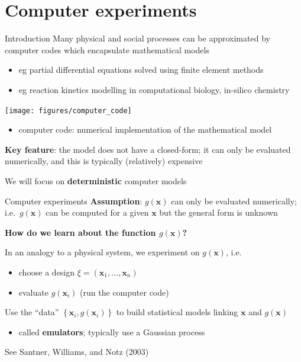 \documentclass[
  ignorenonframetext,
]{beamer}
\providecommand{\tightlist}{%
  \setlength{\itemsep}{0pt}\setlength{\parskip}{0pt}}
\begin{document}
\hypertarget{computer-experiments}{%
\section{Computer experiments}\label{computer-experiments}}

\begin{frame}{Introduction}
\protect\hypertarget{introduction-2}{}
Many physical and social processes can be approximated by computer codes
which encapsulate mathematical models

\begin{itemize}
\tightlist
\item
  eg partial differential equations solved using finite element methods
\item
  eg reaction kinetics modelling in computational biology, in-silico
  chemistry
\end{itemize}

\begin{center}\texttt{[image: figures/computer\_code]} \end{center}

\begin{itemize}
\tightlist
\item
  computer code: numerical implementation of the mathematical model
\end{itemize}

\textbf{Key feature}: the model does not have a closed-form; it can only
be evaluated numerically, and this is typically (relatively) expensive

We will focus on \textbf{deterministic} computer models
\end{frame}

\begin{frame}{Computer experiments}
\protect\hypertarget{computer-experiments-1}{}
\textbf{Assumption}: \(g(\boldsymbol{x})\) can only be evaluated
numerically; i.e.~\(g(\boldsymbol{x})\) can be computed for a given
\(\boldsymbol{x}\) but the general form is unknown

\textbf{How do we learn about the function \(g(\boldsymbol{x})\)?}

In an analogy to a physical system, we experiment on
\(g(\boldsymbol{x})\), i.e.

\begin{itemize}
\tightlist
\item
  choose a design \(\xi = (\boldsymbol{x}_1,\ldots, \boldsymbol{x}_n)\)
\item
  evaluate \(g(\boldsymbol{x}_i)\) (run the computer code)
\end{itemize}

Use the ``data''
\(\left\{\boldsymbol{x}_i, g(\boldsymbol{x}_i)\right\}\) to build
statistical models linking \(\boldsymbol{x}\) and \(g(\boldsymbol{x})\)

\begin{itemize}
\tightlist
\item
  called \textbf{emulators}; typically use a Gaussian process
\end{itemize}

See Santner, Williams, and Notz (2003)
\end{frame}
\end{document}
